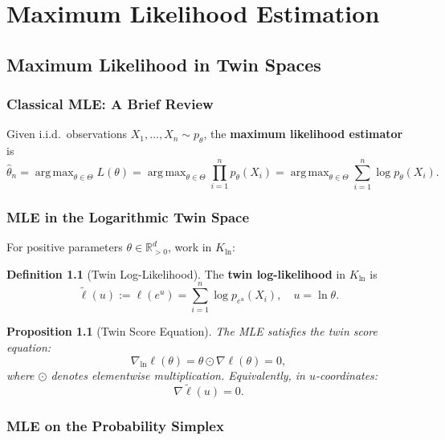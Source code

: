 \documentclass[11pt,twoside]{book}
\theoremstyle{plain}
\newtheorem{proposition}[theorem]{Proposition}
\theoremstyle{definition}
\newtheorem{definition}[theorem]{Definition}
\theoremstyle{remark}
\newcommand{\R}{\mathbb{R}}
\newcommand{\Kln}{K_{\ln}}
\DeclareMathOperator*{\argmax}{arg\,max}
\newcommand{\Rpos}{\R_{>0}}
\begin{document}
\part{Maximum Likelihood Estimation}
\label{part:mle}


\chapter{Maximum Likelihood in Twin Spaces}
\label{ch:mle}

\section{Classical MLE: A Brief Review}
\label{sec:classical_mle}

Given i.i.d.\ observations $X_1, \ldots, X_n \sim p_\theta$, the \textbf{maximum likelihood estimator} is
\[
\hat{\theta}_n = \argmax_{\theta \in \Theta} L(\theta) = \argmax_{\theta \in \Theta} \prod_{i=1}^n p_\theta(X_i) = \argmax_{\theta \in \Theta} \sum_{i=1}^n \log p_\theta(X_i).
\]

\section{MLE in the Logarithmic Twin Space}
\label{sec:mle_kln}

For positive parameters $\theta \in \Rpos^d$, work in $\Kln$:

\begin{definition}[Twin Log-Likelihood]
    The \textbf{twin log-likelihood} in $\Kln$ is
    \[
    \tilde{\ell}(u) := \ell(e^u) = \sum_{i=1}^n \log p_{e^u}(X_i), \quad u = \ln \theta.
    \]
\end{definition}

\begin{proposition}[Twin Score Equation]
    The MLE satisfies the twin score equation:
    \[
    \nabla_{\ln} \ell(\theta) = \theta \odot \nabla \ell(\theta) = 0,
    \]
    where $\odot$ denotes elementwise multiplication. Equivalently, in $u$-coordinates:
    \[
    \nabla \tilde{\ell}(u) = 0.
    \]
\end{proposition}

\section{MLE on the Probability Simplex}
\label{sec:mle_simplex}
\end{document}

